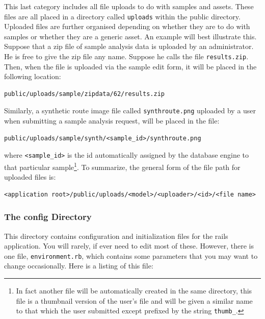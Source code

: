 \documentclass[12pt,twoside]{article}
\begin{document}
This last category includes all file
uploads to do with samples and assets. These files are all placed in
a directory called \verb=uploads= within the public directory.
Uploaded files are further organised depending on whether they are to
do with samples or whether they are a generic asset.
An example will best illustrate this. Suppose that a zip file of sample
analysis data is uploaded by an administrator. He is free to give the zip file
any name. Suppose he calls the file \verb=results.zip=. Then, when the file
is uploaded via the sample edit form, it will be placed in the
following location:
\begin{verbatim}
public/uploads/sample/zipdata/62/results.zip
\end{verbatim}

Similarly, a synthetic route image file called \verb=synthroute.png=
 uploaded by a user when submitting a 
sample analysis request, will be placed in the file:
\begin{verbatim}
public/uploads/sample/synth/<sample_id>/synthroute.png
\end{verbatim}
where \verb=<sample_id>= is the id automatically assigned by the database
engine to that particular sample\footnote{In fact another file will be
automatically created in the same directory, this file is a thumbnail
version of the user's file and will be given a similar name to that
which the user submitted except prefixed by the string \texttt{thumb\_}.}.
To summarize, the general form of the file path for uploaded files is:
\begin{verbatim}
<application root>/public/uploads/<model>/<uploader>/<id>/<file name>
\end{verbatim}

\subsubsection{The config Directory}\label{sec:parameters}
This directory contains configuration and initialization files
for the rails application. You will rarely, if ever need to edit most
of these. However, there is one file, \verb=environment.rb=, which
contains some parameters that you may want to change occasionally.
Here is a listing of this file:
\end{document}
